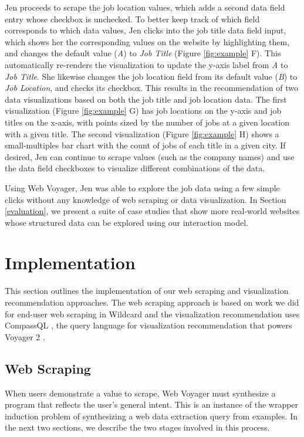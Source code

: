 \documentclass{vgtc}                          %
\begin{document}
Jen proceeds to scrape the job location values, which adds a second data field entry whose checkbox is unchecked. To better keep track of which
field corresponds to which data values, Jen clicks into the job title data field input, which shows her the corresponding values on the website by highlighting
them, and changes the default value (\emph{A}) to \emph{Job Title} (Figure \ref{fig:example} F). This automatically re-renders the visualization to update the y-axis label from \emph{A} to \emph{Job Title}.
She likewise changes the job location field from its default value (\emph{B}) to \emph{Job Location}, and checks its checkbox. This results in the recommendation of two data
visualizations based on both the job title and job location data. The first visualization (Figure \ref{fig:example} G) has job locations on the y-axis and
job titles on the x-axis, with points sized by the number of jobs at a given location with a given title. The second visualization
(Figure \ref{fig:example} H) shows a small-multiples bar chart with the count of jobs of each title in a given city. If desired, Jen can continue 
to scrape values (such as the company names) and use the data field checkboxes to visualize different combinations of the data.

Using Web Voyager, Jen was able to explore the job data using a few simple clicks without any knowledge of web scraping or data visualization.
In Section \ref{evaluation}, we present a suite of case studies that show more real-world websites whose structured data can be explored
using our interaction model.

\section{Implementation} \label{implementation}

This section outlines the implementation of our web scraping and visualization recommendation approaches. The web scraping approach is based on work we did for end-user web scraping in Wildcard \cite{litt2020} and the visualization recommendation uses CompassQL \cite{wongsuphasawat2016}, the query language for visualization recommendation that powers Voyager 2 \cite{wongsuphasawat2017}.

\subsection{Web Scraping}

When users demonstrate a value to scrape, Web Voyager must synthesize a program that reflects the user’s general intent. This is an instance of the wrapper induction \cite{kushmerick2000} problem of synthesizing a web data extraction query from examples. In the next two sections, we describe the two stages involved in this process.
\end{document}
